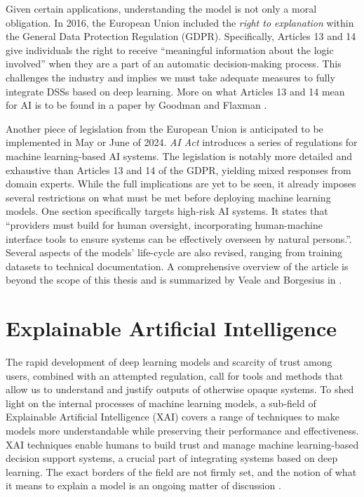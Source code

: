 Given certain applications, understanding the model is not only a moral obligation.
In 2016, the European Union included the \emph{right to explanation} within the General Data Protection Regulation (GDPR).
Specifically, Articles 13 and 14 give individuals the right to receive ``meaningful information about the logic involved'' when they are a part of an automatic decision-making process.
This challenges the industry and implies we must take adequate measures to fully integrate DSSs based on deep learning.
More on what Articles 13 and 14 mean for AI is to be found in a paper by Goodman and Flaxman \cite{xai-gdpr}.

Another piece of legislation from the European Union is anticipated to be implemented in May or June of 2024.
\emph{AI Act} introduces a series of regulations for machine learning-based AI systems.
The legislation is notably more detailed and exhaustive than Articles 13 and 14 of the GDPR, yielding mixed responses from domain experts.
While the full implications are yet to be seen, it already imposes several restrictions on what must be met before deploying machine learning models.
One section specifically targets high-risk AI systems.
It states that ``providers must build for human oversight, incorporating human-machine interface tools to ensure systems can be effectively overseen by natural persons.''.
Several aspects of the models' life-cycle are also revised, ranging from training datasets to technical documentation.
A comprehensive overview of the article is beyond the scope of this thesis and is summarized by Veale and Borgesius in \cite{xai-ai-act}.

\section{Explainable Artificial Intelligence}

The rapid development of deep learning models and scarcity of trust among users, combined with an attempted regulation, call for tools and methods that allow us to understand and justify outputs of otherwise opaque systems.
To shed light on the internal processes of machine learning models, a sub-field of Explainable Artificial Intelligence (XAI) covers a range of techniques to make models more understandable while preserving their performance and effectiveness.
XAI techniques enable humans to build trust and manage machine learning-based decision support systems, a crucial part of integrating systems based on deep learning.
The exact borders of the field are not firmly set, and the notion of what it means to explain a model is an ongoing matter of discussion \cite{xai-survey}.

